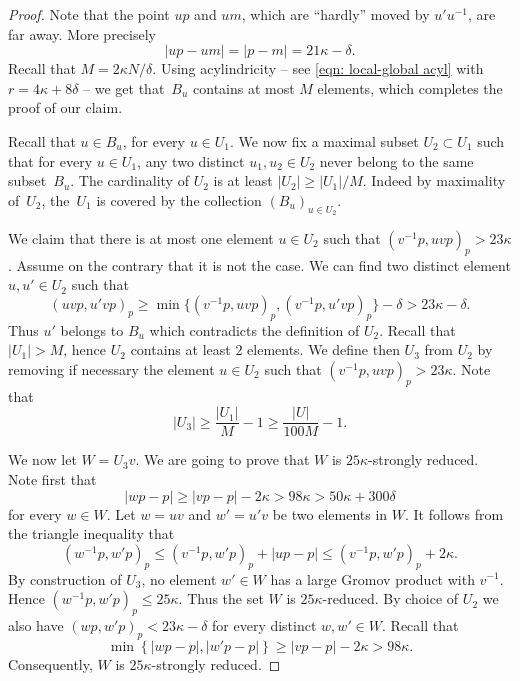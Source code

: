 \documentclass[11pt]{article}
\theoremstyle{plain}
\theoremstyle{definition}
\begin{document}
\begin{proof}
Note that the point $up$ and $um$, which are ``hardly'' moved by $u'u^{-1}$, are far away.
More precisely
\begin{equation*}
|up- um| = |p - m|= 21\kappa - \delta.
\end{equation*}
Recall that $M = 2\kappa N /\delta$.
Using acylindricity -- see \eqref{eqn: local-global acyl} with $r = 4\kappa + 8\delta$ -- we get that~$B_u$ contains at most $M$ elements, which completes the proof of our claim.

Recall that $u \in B_u$, for every $u \in U_1$.
We now fix a maximal subset $U_2 \subset U_1$ such that for every $u \in U_1$, any two distinct $u_1, u_2 \in U_2$ never belong to the same subset~$B_u$.
The cardinality of $U_2$ is at least $|U_2| \geq |U_1|/M$.
Indeed by maximality of~$U_2$, the~$U_1$ is covered by the collection $(B_u)_{u \in U_2}$.

We claim that there is at most one element $u \in U_2$ such that $(v^{-1}p, uvp)_p > 23\kappa$.
Assume on the contrary that it is not the case.
We can find two distinct element $u,u' \in U_2$ such that
\begin{equation*}
(uvp,u'vp)_p \geq \min\{ (v^{-1}p, uvp)_p, (v^{-1}p, u'vp)_p\} - \delta > 23\kappa - \delta.
\end{equation*}
Thus $u'$ belongs to $B_u$ which contradicts the definition of $U_2$.
Recall that $|U_1| > M$, hence $U_2$ contains at least $2$ elements.
We define then $U_3$ from $U_2$ by removing if necessary the element $u \in U_2$ such that $(v^{-1}p, uvp)_p > 23\kappa$.
Note that
\begin{equation*}
|U_3| \geq \frac{|U_1|}M - 1 \geq \frac{|U|}{100M} - 1.
\end{equation*}

We now let $W = U_3v$.
We are going to prove that $W$ is $25\kappa$-strongly reduced.
Note first that
\begin{equation*}
|wp - p| \geq |vp - p| - 2\kappa > 98 \kappa > 50\kappa + 300\delta
\end{equation*}
for every $w \in W$.
Let $w = uv$ and $w' = u'v$ be two elements in $W$.
It follows from the triangle inequality that
\begin{equation*}
(w^{-1}p, w'p) _p \leq (v^{-1}p, w'p)_p + |up - p| \leq (v^{-1}p, w'p)_p + 2\kappa.
\end{equation*}
By construction of $U_3$, no element $w' \in W$ has a large Gromov product with $v^{-1}$.
Hence $(w^{-1}p, w'p) _p \leq 25\kappa$.
Thus the set $W$ is $25\kappa$-reduced.
By choice of $U_2$ we also have $(wp,w'p)_p < 23\kappa - \delta$ for every distinct $w,w' \in W$.
Recall that
\begin{equation*}
\min\left\{ |wp-p|, |w'p-p| \right\} \geq |vp - p| - 2\kappa > 98\kappa.
\end{equation*}
Consequently, $W$ is $25\kappa$-strongly reduced.
\end{proof}
\end{document}
